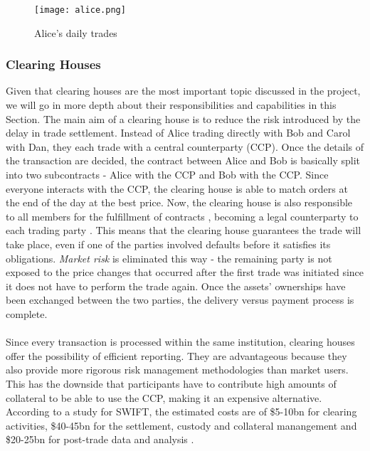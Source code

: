 \documentclass[12pt,twoside]{article}
\begin{document}
\begin{figure}[H]
\centering
\texttt{[image: alice.png]}
\centering
\caption{Alice's daily trades}
\label{fig:alice}
\end{figure}

\subsubsection{Clearing Houses}
\label{sub:CH}
Given that clearing houses are the most important topic discussed in the project, we will go in more depth about their responsibilities and capabilities in this Section. The main aim of a clearing house is to reduce the risk introduced by the delay in trade settlement. Instead of Alice trading directly with Bob and Carol with Dan, they each trade with a central counterparty (CCP). Once the details of the transaction are decided, the contract between Alice and Bob is basically split into two subcontracts - Alice with the CCP and Bob with the CCP. Since everyone interacts with the CCP, the clearing house is able to match orders at the end of the day at the best price. Now, the clearing house is also responsible to all members for the fulfillment of contracts \cite{clearinghouse}, becoming a legal counterparty to each trading party \cite{whatclearing} \cite{whatclearing2}. This means that the clearing house guarantees the trade will take place, even if one of the parties involved defaults before it satisfies its obligations. \textit{Market risk} is eliminated this way - the remaining party is not exposed to the price changes that occurred after the first trade was initiated since it does not have to perform the trade again. Once the assets' ownerships have been exchanged between the two parties, the delivery versus payment process is complete.
\\ \\
Since every transaction is processed within the same institution, clearing houses offer the possibility of efficient reporting. They are advantageous because they also provide more rigorous risk management methodologies than market users. This has the downside that participants have to contribute high amounts of collateral to be able to use the CCP, making it an expensive alternative. According to a study for SWIFT, the estimated costs are of \$5-10bn for clearing activities, \$40-45bn for the settlement, custody and collateral manangement and \$20-25bn for post-trade data and analysis \cite{DLTclearing}. 
\end{document}

